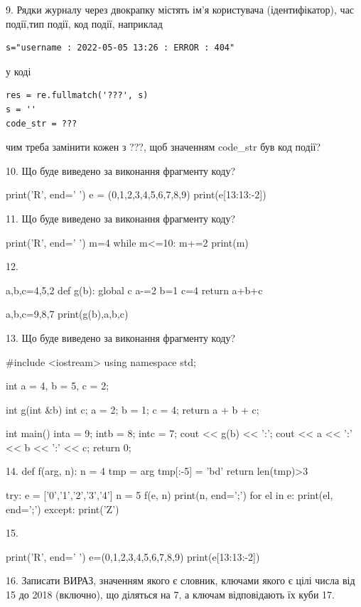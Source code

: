 \documentclass[11pt]{article}
\begin{document}
9. 
Рядки журналу через двокрапку містять ім'я користувача (ідентифікатор), час події,тип події, код події, наприклад
\begin{verbatim}
s="username : 2022-05-05 13:26 : ERROR : 404"
\end{verbatim}
у коді 
\begin{verbatim}
res = re.fullmatch('???', s) 
s = ''
code_str = ??? 
\end{verbatim}
чим треба замінити кожен з ???, щоб значенням code\_str був код події? 



10. Що буде виведено за виконання фрагменту коду?

print('R', end=' ')
e = (0,1,2,3,4,5,6,7,8,9)
print(e[13:13:-2])


11. Що буде виведено за виконання фрагменту коду?

print('R', end=' ')
m=4
while m<=10:
    m+=2
print(m)


12. 

a,b,c=4,5,2
def g(b):
global c    a-=2
    b=1
    c=4
    return a+b+c

a,b,c=9,8,7
print(g(b),a,b,c)

13. Що буде виведено за виконання фрагменту коду?

#include <iostream>
using namespace std;

int a = 4, b = 5, c = 2;

int g(int &b){
int c;    a = 2;
    b = 1;
    c = 4;
    return a + b + c;
}

int main(){
    inta = 9;
    intb = 8;
    intc = 7;
    cout << g(b) << ':';
    cout << a << ':' << b << ':' << c;
    return 0; 
}

14. 
def f(arg, n):
    n = 4
    tmp = arg
    tmp[:-5] = 'bd'
    return len(tmp)>3

try:
    e = ['0','1','2','3','4']
    n = 5
    f(e, n)
    print(n, end=';')
    for el in e:
        print(el, end=';')
except:
    print('Z')

15. 

print('R', end=' ')
e=(0,1,2,3,4,5,6,7,8,9)
print(e[13:13:-2])


16. 
Записати ВИРАЗ, значенням якого є словник, ключами якого є цілі числа від 15 до 2018 (включно), що діляться на 7, а ключам відповідають їх куби 
17. 
\end{document}
